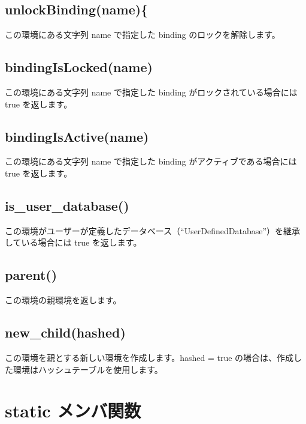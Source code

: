 \documentclass[]{book}
\begin{document}
\hypertarget{unlockbindingname}{%
\subsection{unlockBinding(name)\{}\label{unlockbindingname}}

この環境にある文字列 name で指定した binding のロックを解除します。

\hypertarget{bindingislockedname}{%
\subsection{bindingIsLocked(name)}\label{bindingislockedname}}

この環境にある文字列 name で指定した binding がロックされている場合には true を返します。

\hypertarget{bindingisactivename}{%
\subsection{bindingIsActive(name)}\label{bindingisactivename}}

この環境にある文字列 name で指定した binding がアクティブである場合には true を返します。

\hypertarget{is_user_database}{%
\subsection{is\_user\_database()}\label{is_user_database}}

この環境がユーザーが定義したデータベース（``UserDefinedDatabase''）を継承している場合には true を返します。

\hypertarget{parent}{%
\subsection{parent()}\label{parent}}

この環境の親環境を返します。

\hypertarget{new_childhashed}{%
\subsection{new\_child(hashed)}\label{new_childhashed}}

この環境を親とする新しい環境を作成します。hashed = true の場合は、作成した環境はハッシュテーブルを使用します。

\hypertarget{static-}{%
\section{static メンバ関数}\label{static-}}
\end{document}
